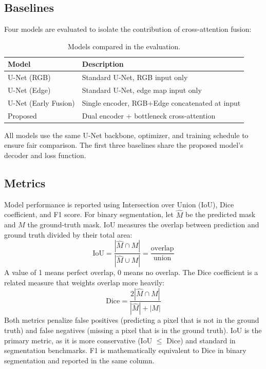 \subsection{Baselines}

Four models are evaluated to isolate the contribution of cross-attention fusion:

\begin{table}[h]
\centering
\caption{Models compared in the evaluation.}
\label{tab:baselines}
\begin{tabular}{ll}
\hline
\textbf{Model} & \textbf{Description} \\
\hline
U-Net (RGB) & Standard U-Net, RGB input only \\
U-Net (Edge) & Standard U-Net, edge map input only \\
U-Net (Early Fusion) & Single encoder, RGB+Edge concatenated at input \\
Proposed & Dual encoder + bottleneck cross-attention \\
\hline
\end{tabular}
\end{table}

All models use the same U-Net backbone, optimizer, and training schedule to ensure fair comparison. The first three baselines share the proposed model's decoder and loss function.

\subsection{Metrics}

Model performance is reported using Intersection over Union (IoU), Dice coefficient, and F1 score. For binary segmentation, let $\hat{M}$ be the predicted mask and $M$ the ground-truth mask. IoU measures the overlap between prediction and ground truth divided by their total area:
%
\begin{equation}
\text{IoU} = \frac{|\hat{M} \cap M|}{|\hat{M} \cup M|} = \frac{\text{overlap}}{\text{union}}
\end{equation}
%
A value of 1 means perfect overlap, 0 means no overlap. The Dice coefficient is a related measure that weights overlap more heavily:
%
\begin{equation}
\text{Dice} = \frac{2|\hat{M} \cap M|}{|\hat{M}| + |M|}
\end{equation}
%
Both metrics penalize false positives (predicting a pixel that is not in the ground truth) and false negatives (missing a pixel that is in the ground truth). IoU is the primary metric, as it is more conservative (IoU $\leq$ Dice) and standard in segmentation benchmarks. F1 is mathematically equivalent to Dice in binary segmentation and reported in the same column.

